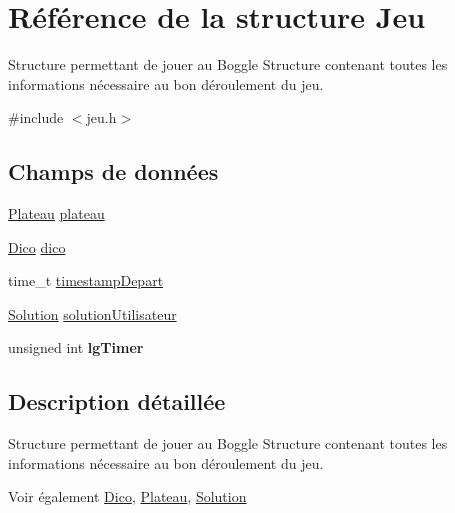 \hypertarget{structJeu}{\section{Référence de la structure Jeu}
\label{structJeu}
}


Structure permettant de jouer au Boggle Structure contenant toutes les informations nécessaire au bon déroulement du jeu.  




{\ttfamily \#include $<$jeu.\-h$>$}

\subsection*{Champs de données}
\begin{DoxyCompactItemize}
\item 
\hyperlink{structPlateau}{Plateau} \hyperlink{structJeu_af2931c71f6de940ec7ed3fcd2f9d7158}{plateau}
\item 
\hyperlink{structDico}{Dico} \hyperlink{structJeu_a6bda384c6fca4e83ae15ac69f2228a41}{dico}
\item 
time\-\_\-t \hyperlink{structJeu_af48a5fddf1dc40b7c4a85918d73f201d}{timestamp\-Depart}
\item 
\hyperlink{structSolution}{Solution} \hyperlink{structJeu_ae8e1dca71285915404d1de4ff609a1d6}{solution\-Utilisateur}
\item 
\hypertarget{structJeu_ab04f7d1519162e9e351d7d90139fbc7f}{unsigned int {\bfseries lg\-Timer}}\label{structJeu_ab04f7d1519162e9e351d7d90139fbc7f}

\end{DoxyCompactItemize}


\subsection{Description détaillée}
Structure permettant de jouer au Boggle Structure contenant toutes les informations nécessaire au bon déroulement du jeu. 

\begin{DoxySeeAlso}{Voir également}
\hyperlink{structDico}{Dico}, \hyperlink{structPlateau}{Plateau}, \hyperlink{structSolution}{Solution} 
\end{DoxySeeAlso}


